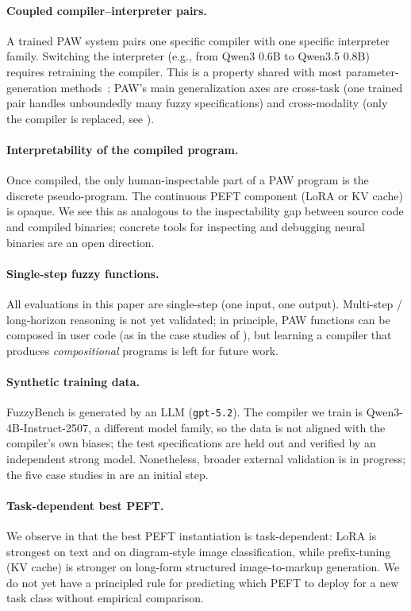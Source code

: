 \paragraph{Coupled compiler--interpreter pairs.}
A trained PAW system pairs one specific compiler with one specific interpreter family. Switching the interpreter (e.g., from Qwen3 0.6B to Qwen3.5 0.8B) requires retraining the compiler. This is a property shared with most parameter-generation methods~\citep{charakorn2025texttolora,chen2025generative}; PAW's main generalization axes are cross-task (one trained pair handles unboundedly many fuzzy specifications) and cross-modality (only the compiler is replaced, see ).

\paragraph{Interpretability of the compiled program.}
Once compiled, the only human-inspectable part of a PAW program is the discrete pseudo-program. The continuous PEFT component (LoRA or KV cache) is opaque. We see this as analogous to the inspectability gap between source code and compiled binaries; concrete tools for inspecting and debugging neural binaries are an open direction.

\paragraph{Single-step fuzzy functions.}
All evaluations in this paper are single-step (one input, one output). Multi-step / long-horizon reasoning is not yet validated; in principle, PAW functions can be composed in user code (as in the case studies of ), but learning a compiler that produces \emph{compositional} programs is left for future work.

\paragraph{Synthetic training data.}
FuzzyBench is generated by an LLM (\texttt{gpt-5.2}). The compiler we train is Qwen3-4B-Instruct-2507, a different model family, so the data is not aligned with the compiler's own biases; the test specifications are held out and verified by an independent strong model. Nonetheless, broader external validation is in progress; the five case studies in  are an initial step.

\paragraph{Task-dependent best PEFT.}
We observe in  that the best PEFT instantiation is task-dependent: LoRA is strongest on text and on diagram-style image classification, while prefix-tuning (KV cache) is stronger on long-form structured image-to-markup generation. We do not yet have a principled rule for predicting which PEFT to deploy for a new task class without empirical comparison.


